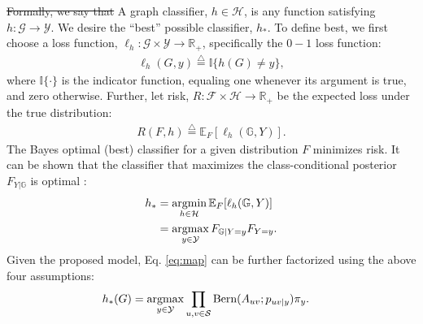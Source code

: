 \documentclass[10pt,journal,cspaper,compsoc]{IEEEtran}
\newcommand{\argmax}{\operatornamewithlimits{argmax}}
\newcommand{\argmin}{\operatornamewithlimits{argmin}}
\newcommand{\GG}{\mathbb{G}}
\newcommand{\EE}{\mathbb{E}}           %
\newcommand{\II}{\mathbb{I}}           %
\providecommand{\mc}[1]{\mathcal{#1}}
\newcommand{\Real}{\mathbb{R}}
\newcommand{\defeq}{\overset{\triangle}{=}}
\begin{document}
\sout{Formally, we say that} A graph classifier, $h \in \mc{H}$, is any function satisfying $h: \mc{G} \to \mc{Y}$.  We desire the ``best'' possible classifier, $h_*$. To define best, we first choose a loss function, $\ell_h: \mc{G} \times \mc{Y} \to \Real_+$, specifically the $0-1$ loss function:
\begin{align}
\ell_h(G,y) \defeq \II \{h(G) \neq y\}, %
\end{align}
where $\II\{\cdot\}$ is the indicator function, equaling one whenever its argument is true, and zero otherwise.  Further, let risk, $R: \mc{F} \times \mc{H} \to \Real_+$ be the expected loss under the true distribution:
\begin{align}
R(F,h) \defeq \EE_F[\ell_h(\GG,Y)].
\end{align}
The Bayes optimal (best) classifier for a given distribution $F$ minimizes risk.
It can be shown that the classifier that maximizes the class-conditional posterior $F_{Y | \GG}$ is optimal \cite{Bickel2000}:
\begin{align} \label{eq:map}
h_* &= \argmin_{h \in \mc{H}} \EE_F[\ell_h (\GG,Y)] %
\nonumber \\ &= \argmax_{y \in \mc{Y}} F_{\GG|Y=y} F_{Y=y}.
\end{align}
Given the proposed model, Eq. \eqref{eq:map} can be further factorized using the above four assumptions:
\begin{align}
h_*(G)
&= \argmax_{y \in \mc{Y}} \prod_{u,v \in \mc{S}} \text{Bern}(A_{uv}; p_{uv|y}) \pi_y.
\end{align}
\end{document}
